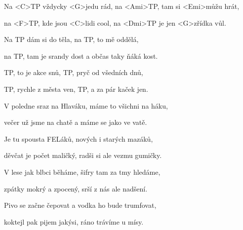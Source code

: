 

\zs
Na <C>TP vždycky <G>jedu rád,
na <Ami>TP, tam si <Emi>můžu hrát,

na <F>TP, kde jsou <C>lidi cool,
na <Dmi>TP je jen <G>zřídka vůl.
\ks

\zs
Na TP dám si do těla,
na TP, to mě oddělá,

na TP, tam je srandy dost
a občas taky ňáká kost.
\ks

\zr
TP, to je akce snů,
TP, pryč od všedních dnů,

TP, rychle z města ven,
TP, a za pár kaček jen.
\kr

\zs
V poledne sraz na Hlaváku,
máme to všichni na háku,

večer už jsme na chatě
a máme se jako ve vatě.
\ks

\zs
Je tu spousta FELáků,
nových i starých mazáků,

děvčat je počet maličký,
radši si ale vezmu gumičky.
\ks

\zr
\kr

\zs
V lese jak blbci běháme,
šifry tam za tmy hledáme,

zpátky mokrý a zpocený,
srší z nás ale nadšení.
\ks

\zs
Pivo se začne čepovat
a vodka ho bude trumfovat,

koktejl pak pijem jakýsi,
ráno trávíme u mísy.
\ks

\zr
\kr

\kp 

